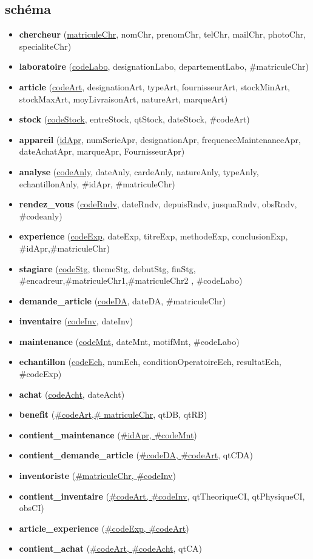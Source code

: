\subsection{schéma}
\begin{itemize}
    \item \textbf{chercheur} (\underline{matriculeChr}, nomChr, prenomChr, telChr, mailChr, photoChr, specialiteChr)  
    \item \textbf{laboratoire} (\underline{codeLabo}, designationLabo, departementLabo, \#matriculeChr)  
    \item \textbf{article} (\underline{codeArt}, designationArt, typeArt, fournisseurArt, stockMinArt, stockMaxArt, moyLivraisonArt, natureArt, marqueArt)  
    \item \textbf{stock} (\underline{codeStock}, entreStock, qtStock, dateStock, \#codeArt)  
    \item \textbf{appareil} (\underline{idApr}, numSerieApr, designationApr, frequenceMaintenanceApr, dateAchatApr, marqueApr, FournisseurApr)  
    \item \textbf{analyse} (\underline{codeAnly}, dateAnly, cardeAnly, natureAnly, typeAnly, echantillonAnly, \#idApr, \#matriculeChr)  
    \item \textbf{rendez\_vous} (\underline{codeRndv}, dateRndv, depuisRndv, jusquaRndv, obsRndv, \#codeanly)  
    \item \textbf{experience} (\underline{codeExp}, dateExp, titreExp, methodeExp, conclusionExp, \#idApr,\#matriculeChr)  
    \item \textbf{stagiare} (\underline{codeStg}, themeStg, debutStg, finStg, \#encadreur,\#matriculeChr1,\#matriculeChr2 , \#codeLabo)  
    \item \textbf{demande\_article} (\underline{codeDA}, dateDA, \#matriculeChr)  
    \item \textbf{inventaire} (\underline{codeInv}, dateInv)  
    \item \textbf{maintenance} (\underline{codeMnt}, dateMnt, motifMnt, \#codeLabo)  
    \item \textbf{echantillon} (\underline{codeEch}, numEch, conditionOperatoireEch, resultatEch, \#codeExp)  
    \item \textbf{achat} (\underline{codeAcht}, dateAcht)  
    \item \textbf{benefit} (\underline{\#codeArt,\# matriculeChr}, qtDB, qtRB)  
    \item \textbf{contient\_maintenance} (\underline{\#idApr, \#codeMnt})  
    \item \textbf{contient\_demande\_article} (\underline{\#codeDA, \#codeArt}, qtCDA)  
    \item \textbf{inventoriste} (\underline{\#matriculeChr, \#codeInv})  
    \item \textbf{contient\_inventaire} (\underline{\#codeArt, \#codeInv}, qtTheoriqueCI, qtPhysiqueCI, obsCI)  
    \item \textbf{article\_experience} (\underline{\#codeExp, \#codeArt})  
    \item \textbf{contient\_achat} (\underline{\#codeArt, \#codeAcht}, qtCA) 

\end{itemize}
